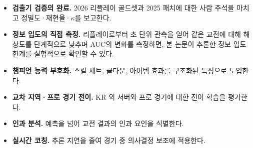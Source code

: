 \begin{itemize}[leftmargin=1.5em]
  \item \textbf{검출기 검증의 완료.} 2026 리플레이 골드셋과 2025 패치에 대한 사람 주석을 마치고 정밀도·재현율·$\kappa$를 보고한다.
  \item \textbf{정보 입도의 직접 측정.} 리플레이로부터 초 단위 관측을 얻어 같은 교전에 대해 해상도를 단계적으로 낮추며 AUC의 변화를 측정하면, 본 논문이 추론한 정보 입도 한계를 실험적으로 확인할 수 있다.
  \item \textbf{챔피언 능력 부호화.} 스킬 세트, 쿨다운, 아이템 효과를 구조화된 특징으로 도입한다.
  \item \textbf{교차 지역·프로 경기 전이.} KR 외 서버와 프로 경기에 대한 전이 학습을 평가한다.
  \item \textbf{인과 분석.} 예측을 넘어 교전 결과의 인과 요인을 식별한다.
  \item \textbf{실시간 코칭.} 추론 지연을 줄여 경기 중 의사결정 보조에 적용한다.
\end{itemize}

